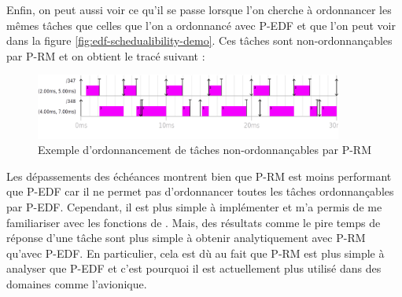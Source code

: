 Enfin, on peut aussi voir ce qu'il se passe lorsque l'on cherche à ordonnancer les mêmes tâches que celles que l'on a ordonnancé avec P-EDF et que l'on peut voir dans la figure \ref{fig:edf-schedualibility-demo}. Ces tâches sont non-ordonnançables par P-RM et on obtient le tracé suivant :

\begin{figure}[H]
    \centering
    \includegraphics[width=0.9\textwidth]{Images/RM_rMerde.png}
    \caption{Exemple d'ordonnancement de tâches non-ordonnançables par P-RM}
\end{figure}

Les dépassements des échéances montrent bien que P-RM est moins performant que P-EDF car il ne permet pas d'ordonnancer toutes les tâches ordonnançables par P-EDF. Cependant, il est plus simple à implémenter et m'a permis de me familiariser avec les fonctions de \litmus. Mais, des résultats comme le pire temps de réponse d'une tâche sont plus simple à obtenir analytiquement avec P-RM qu'avec P-EDF. En particulier, cela est dù au fait que P-RM est plus simple à analyser que P-EDF et c'est pourquoi il est actuellement plus utilisé dans des domaines comme l'avionique.
